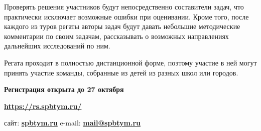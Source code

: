 \documentclass[a4paper,14pt]{extarticle}
\begin{document}
Проверять решения участников будут непосредственно составители задач, что практически исключает возможные ошибки при оценивании. Кроме того, после каждого из туров регаты авторы задач будут давать небольшие методические комментарии по своим задачам, рассказывать о возможных направлениях дальнейших исследований по ним. 

Регата проходит в полностью дистанционной форме, поэтому участие в ней могут принять участие команды, собранные из детей из разных школ или городов.\vspace{-2mm}

\begin{center}
	{\bf Регистрация открыта до 27 октября}
	\vspace{2mm}

	\vspace{2mm}
	
	{\bf\url{https://rs.spbtym.ru/}}
\end{center}

сайт: {\bf\url{spbtym.ru}} \hfill e-mail: {\bf\url{mail@spbtym.ru}}

\clearpage
\end{document}
